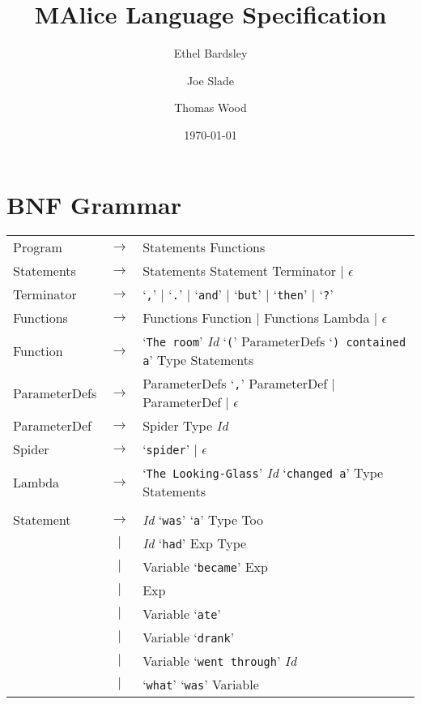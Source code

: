 \documentclass[a4paper,11pt]{article}
\begin{document}
\title{MAlice Language Specification}

\author{Ethel Bardsley \and Joe Slade \and Thomas Wood}

\date{\today}         %

\maketitle            %

\section{BNF Grammar} 
\begin{tabular}{lcl}
Program     & $\to$ & Statements Functions \\
Statements  & $\to$ & Statements Statement Terminator $|$ $\epsilon$ \\
Terminator  & $\to$ & `\verb:,:' $|$ `\verb:.:' $|$ `\verb:and:' $|$ `\verb:but:' $|$ `\verb:then:' $|$ `\verb|?|'\\
Functions   & $\to$ & Functions Function $|$ Functions Lambda $|$ $\epsilon$ \\
Function    & $\to$ & `\verb|The room|' \emph{Id} `\verb|(|' ParameterDefs `\verb|) contained a|' Type Statements \\
ParameterDefs & $\to$ & ParameterDefs `\verb|,|' ParameterDef $|$ ParameterDef $|$ $\epsilon$ \\
ParameterDef  & $\to$ & Spider Type \emph{Id} \\
Spider      & $\to$ & `\verb|spider|' $|$ $\epsilon$ \\
Lambda      & $\to$ & `\verb|The Looking-Glass|' \emph{Id} `\verb|changed a|' Type Statements \\
\\
Statement   & $\to$ & \emph{Id} `\verb|was|' `\verb|a|' Type Too \\
            &  $|$  & \emph{Id} `\verb|had|' Exp Type \\
            &  $|$  & Variable `\verb|became|' Exp \\
            &  $|$  & Exp \\
            &  $|$  & Variable `\verb|ate|' \\
            &  $|$  & Variable `\verb|drank|' \\
            &  $|$  & Variable `\verb|went through|' \emph{Id} \\
            &  $|$  & `\verb|what|' `\verb|was|' Variable \\

\end{tabular}
\end{document}
